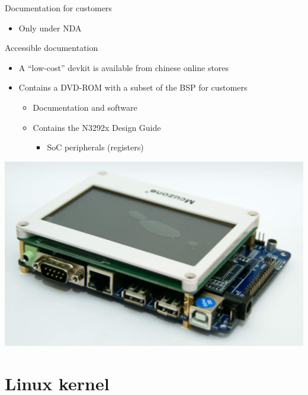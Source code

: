 \documentclass[xetex,table,aspectratio=169]{beamer}
\begin{document}
\begin{frame}{Documentation for customers}
  \begin{itemize}
  \item Only under NDA
  \end{itemize}
\end{frame}

\begin{frame}{Accessible documentation}
  \begin{itemize}
  \item A ``low-cost'' devkit is available from chinese online stores
  \item Contains a DVD-ROM with a subset of the BSP for customers
    \begin{itemize}
    \item Documentation and software
    \item Contains the N3292x Design Guide
      \begin{itemize}
      \item SoC peripherals (registers)
      \end{itemize}
    \end{itemize}
  \end{itemize}
  \begin{center}
    \includegraphics[height=0.4\textheight]{images/devkit.jpg}
  \end{center}
\end{frame}

\section{Linux kernel}
\end{document}
